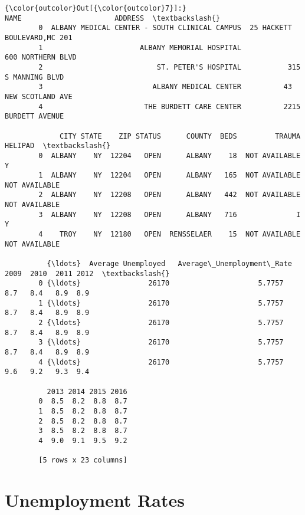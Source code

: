 \documentclass[11pt]{article}
\begin{document}
\begin{Verbatim}[commandchars=\\\{\}]
{\color{outcolor}Out[{\color{outcolor}7}]:}                                             NAME                      ADDRESS  \textbackslash{}
        0  ALBANY MEDICAL CENTER - SOUTH CLINICAL CAMPUS  25 HACKETT BOULEVARD,MC 201   
        1                       ALBANY MEMORIAL HOSPITAL            600 NORTHERN BLVD   
        2                           ST. PETER'S HOSPITAL           315 S MANNING BLVD   
        3                          ALBANY MEDICAL CENTER          43 NEW SCOTLAND AVE   
        4                        THE BURDETT CARE CENTER          2215 BURDETT AVENUE   
        
             CITY STATE    ZIP STATUS      COUNTY  BEDS         TRAUMA        HELIPAD  \textbackslash{}
        0  ALBANY    NY  12204   OPEN      ALBANY    18  NOT AVAILABLE              Y   
        1  ALBANY    NY  12204   OPEN      ALBANY   165  NOT AVAILABLE  NOT AVAILABLE   
        2  ALBANY    NY  12208   OPEN      ALBANY   442  NOT AVAILABLE  NOT AVAILABLE   
        3  ALBANY    NY  12208   OPEN      ALBANY   716              I              Y   
        4    TROY    NY  12180   OPEN  RENSSELAER    15  NOT AVAILABLE  NOT AVAILABLE   
        
          {\ldots}  Average Unemployed   Average\_Unemployment\_Rate  2009  2010  2011 2012  \textbackslash{}
        0 {\ldots}                26170                     5.7757   8.7   8.4   8.9  8.9   
        1 {\ldots}                26170                     5.7757   8.7   8.4   8.9  8.9   
        2 {\ldots}                26170                     5.7757   8.7   8.4   8.9  8.9   
        3 {\ldots}                26170                     5.7757   8.7   8.4   8.9  8.9   
        4 {\ldots}                26170                     5.7757   9.6   9.2   9.3  9.4   
        
          2013 2014 2015 2016  
        0  8.5  8.2  8.8  8.7  
        1  8.5  8.2  8.8  8.7  
        2  8.5  8.2  8.8  8.7  
        3  8.5  8.2  8.8  8.7  
        4  9.0  9.1  9.5  9.2  
        
        [5 rows x 23 columns]
\end{Verbatim}
            
    \section{Unemployment Rates}\label{unemployment-rates}
\end{document}
